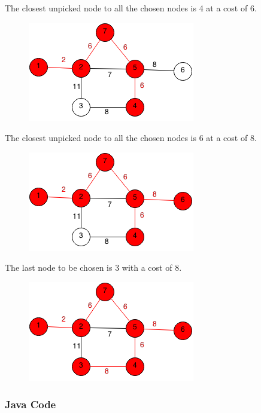 \documentclass[11pt,oneside]{book}
\makeatletter
\def\maxwidth#1{\ifdim\Gin@nat@width>#1 #1\else\Gin@nat@width\fi}
\makeatother
\begin{document}
The closest unpicked node to all the chosen nodes is 4 at a cost of 6.
\vspace{5px}\begin{figure}[H]\centering
        \includegraphics[width=0.66\maxwidth{\textwidth}]{prim5.png}
        \end{figure}

The closest unpicked node to all the chosen nodes is 6 at a cost of 8.
\vspace{5px}\begin{figure}[H]\centering
        \includegraphics[width=0.66\maxwidth{\textwidth}]{prim6.png}
        \end{figure}

The last node to be chosen is 3 with a cost of 8.

\vspace{5px}\begin{figure}[H]\centering
        \includegraphics[width=0.66\maxwidth{\textwidth}]{prim7.png}
        \end{figure}

\subsubsection{Java Code}
\end{document}

